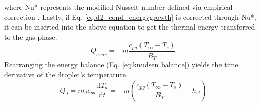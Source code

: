 \documentclass[12pt]{article}
\numberwithin{equation}{section}
\begin{document}
where \textrm{Nu*} represents the modified Nusselt number defined via empirical correction \cite{abramzon1989droplet}. Lastly, if Eq. \ref{eq:d2_cond_energygrowth} is corrected through \textrm{Nu*}, it can be inserted into the above equation to get the thermal energy transferred to the gas phase. 
\begin{equation}
    Q_{conv}=-\dot m \frac{c_{pg}(T_{\infty}-T_{s})}{B_{T}}
\end{equation}
Rearranging the energy balance (Eq. \ref{eq:knudsen balance}) yields the time derivative of the droplet's temperature. 
\begin{equation}\label{eq:heat_out_droplet}
    Q_{d}=m_{d}c_{pd}\frac{\mathrm{d}T_{d}}{\mathrm{d}t}=-\dot{m}\left(\frac{c_{pg}(T_{\infty}-T_{s})}{B_{T}}-h_{vl}\right)
\end{equation}
\end{document}
